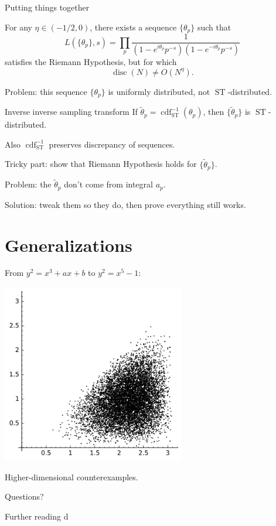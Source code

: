 \documentclass{beamer}
\DeclareMathOperator{\cdf}{cdf}
\DeclareMathOperator{\disc}{disc}
\DeclareMathOperator{\ST}{ST}
\begin{document}
\begin{frame}{Putting things together}
\begin{theorem}
For any $\eta\in (-1/2,0)$, there exists a sequence $\{\theta_p\}$ such that 
\[
	L(\{\theta_p\},s) = \prod_p \frac{1}{(1-e^{i\theta_p} p^{-s})(1-e^{-i\theta_p} p^{-s})}
\]
satisfies the Riemann Hypothesis, but for which 
\[
	\disc(N) \ne O(N^\eta) .
\]
\end{theorem}
\pause

\alert{Problem:} this sequence $\{\theta_p\}$ is uniformly distributed, not 
$\ST$-distributed. 
\end{frame}

\begin{frame}{Inverse inverse sampling transform}
If $\tilde\theta_p = \cdf_{\ST}^{-1}(\theta_p)$, then $\{\tilde\theta_p\}$ is 
$\ST$-distributed. 
\pause

Also $\cdf_{\ST}^{-1}$ preserves discrepancy of sequences. 
\pause

Tricky part: show that Riemann Hypothesis holds for $\{\tilde\theta_p\}$. 
\pause

\alert{Problem:} the $\tilde\theta_p$ don't come from integral $a_p$.
\pause

Solution: tweak them so they do, then prove everything still works. 
\end{frame}





\section{Generalizations}

\begin{frame}
From $y^2=x^3+a x+b$ to $y^2=x^5-1$:
\begin{center}
\includegraphics[width=0.6\textwidth]{genus2}
\end{center}
\pause

Higher-dimensional counterexamples.
\end{frame}

\begin{frame}
\begin{center}
{\Huge Questions?}
\end{center}
\end{frame}

\begin{frame}{Further reading}
d
\end{frame}
\end{document}
